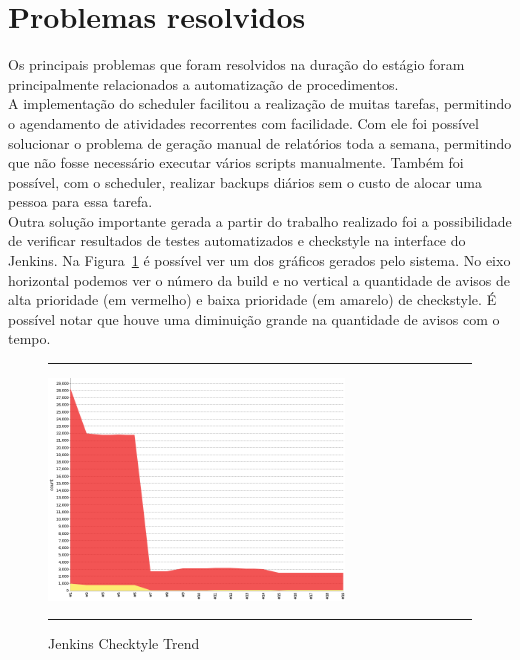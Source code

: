 %
%


\section{Problemas resolvidos}

Os principais problemas que foram resolvidos na duração do estágio foram principalmente relacionados a automatização de procedimentos.\\

A implementação do \gls{scheduler} facilitou a realização de muitas tarefas, permitindo o agendamento de atividades recorrentes com facilidade. Com ele foi possível solucionar o problema de geração manual de relatórios toda a semana, permitindo que não fosse necessário executar vários scripts manualmente. Também foi possível, com o \gls{scheduler}, realizar \glspl{backup} diários sem o custo de alocar uma pessoa para essa tarefa.\\

Outra solução importante gerada a partir do trabalho realizado foi a possibilidade de verificar resultados de testes automatizados e \gls{checkstyle} na interface do \gls{Jenkins}. Na Figura~\ref{fig:jenkinsCheckstyle} é possível ver um dos gráficos gerados pelo sistema. No eixo horizontal podemos ver o número da build e no vertical a quantidade de avisos de alta prioridade (em vermelho) e baixa prioridade (em amarelo) de \gls{checkstyle}. É possível notar que houve uma diminuição grande na quantidade de avisos com o tempo.\\

\begin{figure}[h]
  \rule[1ex]{\textwidth}{0.25pt}
  \centering\includegraphics[width=0.70\textwidth]{img/Jenkins.png}
  \caption[Jenkins Checkstyle Trend]
  {Jenkins Checktyle Trend}\label{fig:jenkinsCheckstyle}
  \rule[1ex]{\textwidth}{0.25pt}
\end{figure}

